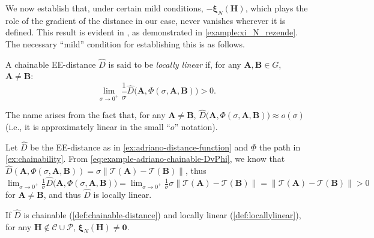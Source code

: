 We now establish that, under certain mild conditions, $-\boldsymbol{\xi}_N(\mathbf{H})$, which plays the role of the gradient of the distance in our case, never vanishes wherever it is defined. This result is evident in \citet{Rezende2022}, as demonstrated in \cref{example:xi_N_rezende}. The necessary ``mild'' condition for establishing this is as follows.

\begin{definition}  \label{def:locallylinear}
    A chainable EE-distance $\widehat{D}$ is said to be \emph{locally linear} if, for any $\mathbf{A}, \mathbf{B} \in G$, $\mathbf{A} \not = \mathbf{B}$:
    \begin{equation}
        \lim_{\sigma \rightarrow 0^+} \frac{1}{\sigma} \widehat{D}\bigl(\mathbf{A},\Phi(\sigma,\mathbf{A},\mathbf{B})\bigr) > 0.
    \end{equation}
\end{definition}
The name arises from the fact that, for any $\mathbf{A} \not= \mathbf{B}$, $\widehat{D}\bigl(\mathbf{A},\Phi(\sigma,\mathbf{A},\mathbf{B})\bigr) \approx o(\sigma)$ (i.e., it is approximately linear in the small ``$o$'' notation).

\begin{example}
    Let $\widehat{D}$ be the EE-distance as in \cref{ex:adriano-distance-function} and $\Phi$ the path in \cref{ex:chainability}. From \eqref{eq:example-adriano-chainable-DvPhi}, we know that $\widehat{D}(\mathbf{A}, \Phi(\sigma, \mathbf{A}, \mathbf{B})) = \sigma\|\mathcal{T}(\mathbf{A}) - \mathcal{T}(\mathbf{B})\|$, thus $\lim_{\sigma \to 0^+} \frac{1}{\sigma} \widehat{D}\bigl(\mathbf{A},\Phi(\sigma,\mathbf{A},\mathbf{B})\bigr) = \lim_{\sigma \to 0^+} \frac{1}{\sigma}\sigma\|\mathcal{T}(\mathbf{A}) - \mathcal{T}(\mathbf{B})\| = \|\mathcal{T}(\mathbf{A}) - \mathcal{T}(\mathbf{B})\| > 0$ for $\mathbf{A} \not= \mathbf{B}$, and thus $\widehat{D}$ is locally linear.
    
\end{example}

\begin{lemma} \label{lemma:no-zero-xiN} If $\widehat{D}$ is chainable (\cref{def:chainable-distance}) and locally linear (\cref{def:locallylinear}), for any $\mathbf{H} \notin \mathcal{C} \cup \mathcal{P}$, $\boldsymbol{\xi}_N(\mathbf{H}) \not= \mathbf{0}$.
\end{lemma}

